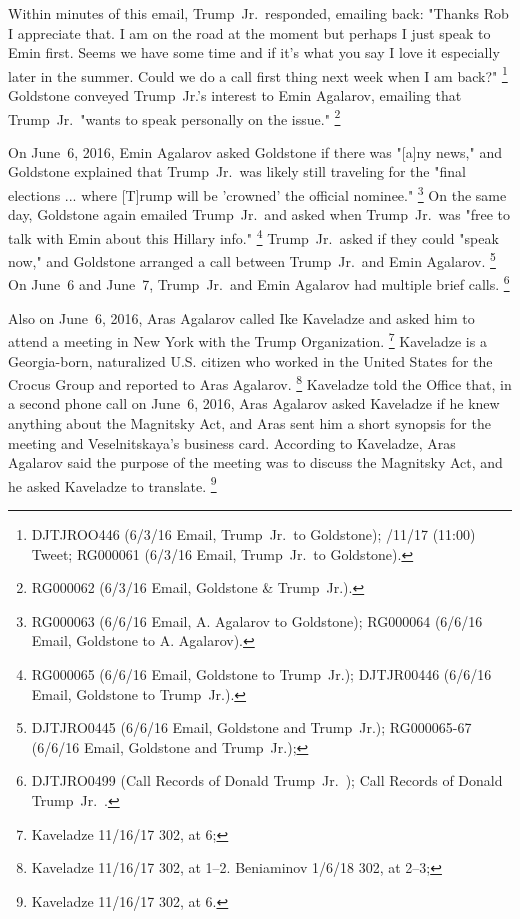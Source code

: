 Within minutes of this email, Trump~Jr.\ responded, emailing back: "Thanks Rob I appreciate that.
I am on the road at the moment but perhaps I just speak to Emin first.
Seems we have some time and if it's what you say I love it especially later in the summer.
Could we do a call first thing next week when I am back?"%
\footnote{DJTJROO446 (6/3/16 Email, Trump~Jr.\ to Goldstone);
/11/17 (11:00) Tweet;
RG000061 (6/3/16 Email, Trump~Jr.\ to Goldstone).}
Goldstone conveyed Trump~Jr.'s interest to Emin Agalarov, emailing that Trump~Jr.\ "wants to speak personally on the issue."%
\footnote{ RG000062 (6/3/16 Email, Goldstone \& Trump~Jr.).}

On June~6, 2016, Emin Agalarov asked Goldstone if there was "[a]ny news," and Goldstone explained that Trump~Jr.\ was likely still traveling for the "final elections ... where [T]rump will be 'crowned' the official nominee."%
\footnote{RG000063 (6/6/16 Email, A. Agalarov to Goldstone);
RG000064 (6/6/16 Email, Goldstone to A. Agalarov).}
On the same day, Goldstone again emailed Trump~Jr.\ and asked when Trump~Jr.\ was "free to talk with Emin about this Hillary info."%
\footnote{RG000065 (6/6/16 Email, Goldstone to Trump~Jr.);
DJTJR00446 (6/6/16 Email, Goldstone to Trump~Jr.).}
Trump~Jr.\ asked if they could "speak now," and Goldstone arranged a call between Trump~Jr.\ and Emin Agalarov.%
\footnote{DJTJRO0445 (6/6/16 Email, Goldstone and Trump~Jr.);
RG000065-67 (6/6/16 Email, Goldstone and Trump~Jr.);
}
On June~6 and June~7, Trump~Jr.\ and Emin Agalarov had multiple brief calls.%
\footnote{DJTJRO0499 (Call Records of Donald Trump~Jr.\ );
Call Records of Donald Trump~Jr.\ .}

Also on June~6, 2016, Aras Agalarov called Ike Kaveladze and asked him to attend a meeting in New York with the Trump Organization.%
\footnote{Kaveladze 11/16/17 302, at 6; }
Kaveladze is a Georgia-born, naturalized U.S. citizen who worked in the United States for the Crocus Group and reported to Aras Agalarov.%
\footnote{Kaveladze 11/16/17 302, at 1--2.
 Beniaminov 1/6/18 302, at 2--3;
}
Kaveladze told the Office that, in a second phone call on June~6, 2016, Aras Agalarov asked Kaveladze if he knew anything about the Magnitsky Act, and Aras sent him a short synopsis for the meeting and Veselnitskaya's business card.
According to Kaveladze, Aras Agalarov said the purpose of the meeting was to discuss the Magnitsky Act, and he asked Kaveladze to translate.%
\footnote{Kaveladze 11/16/17 302, at 6.}

